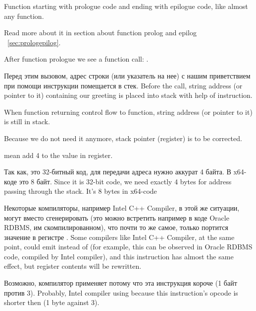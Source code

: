 {Function  starting with prologue code and ending with epilogue code, like almost any function.}

{Read more about it in section about function prolog and epilog}
~\ref{sec:prologepilog}.

{After function prologue we see a function \printf call}: . 

\IFRU
{Перед этим вызовом, адрес строки (или указатель на нее) с нашим приветствием при помощи инструкции \PUSH помещается в стек.}
{Before the call, string address (or pointer to it) containing our greeting is placed into stack with help of \PUSH instruction.}

{When \printf function returning control flow to \main function, string address (or pointer to it) is still in stack.}

{Because we do not need it anymore, stack pointer (\ESP register) is to be corrected.}

 
{mean add 4 to the value in \ESP register.}

\IFRU
{Так как, это 32-битный код, для передачи адреса нужно аккурат 4 байта. В x64-коде это 8 байт.}
{Since it is 32-bit code, we need exactly 4 bytes for address passing through the stack. 
It's 8 bytes in x64-code}

\IFRU
{Некоторые компиляторы, например Intel C++ Compiler, в этой же ситуации, могут вместо 
\ADD сгенерировать  (это можно встретить например в коде Oracle RDBMS, им скомпилированном), 
что почти то же самое, только портится значение в регистре \ECX.}
{Some compilers like Intel C++ Compiler, at the same point, could emit  
instead of \ADD (for example, this can be observed in Oracle RDBMS code, compiled by Intel compiler), 
and this instruction has almost the same effect, but \ECX register contents will be rewritten.}

\IFRU
{Возможно, компилятор применяет  потому что эта инструкция короче (1 байт против 3).}
{Probably, Intel compiler using  because this instruction's opcode is shorter then 
 (1 byte against 3).}

